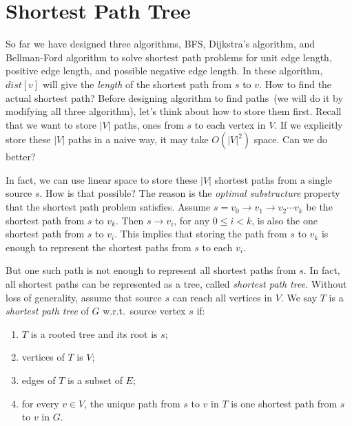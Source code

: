\setcounter{definition}{0} \setcounter{property}{0} \setcounter{claim}{0} \setcounter{fact}{0} \setcounter{corollary}{0} \setcounter{figure}{0}
\section{Shortest Path Tree}

So far we have designed three algorithms, BFS, Dijkstra's algorithm, and Bellman-Ford algorithm
to solve shortest path problems for unit edge length, positive edge length, and possible negative edge length.
In these algorithm, $dist[v]$ will give the \emph{length} of the
shortest path from $s$ to $v$. How to find the actual shortest path?
Before designing algorithm to find paths~(we will do it by modifying all three algorithm),
let's think about how to store them first.
Recall that we want to store $|V|$ paths, ones from $s$ to each vertex in $V$.
If we explicitly store these $|V|$ paths in a naive way, it may take $O(|V|^2)$ space.
Can we do better?

In fact, we can use linear space to store these $|V|$ shortest paths from a single source $s$.
How is that possible? The reason is the \emph{optimal substructure} property that the shortest path problem satisfies.
Assume $s = v_0 \to v_1 \to v_2\cdots v_k$ be the shortest path from $s$ to $v_k$. Then $s \to v_i$, for any $0 \le i < k$,
is also the one shortest path from $s$ to $v_i$. This implies that storing the path from $s$ to $v_k$ is enough to
represent the shortest paths from $s$ to each $v_i$. 

But one such path is not enough to represent all shortest paths from $s$. In fact, all shortest paths
can be represented as a tree, called \emph{shortest path tree}.
Without loss of generality, assume that source $s$ can reach all vertices in $V$.
We say $T$ is a \emph{shortest path tree} of $G$ w.r.t.\ source vertex $s$ if:
\begin{enumerate}
\item $T$ is a rooted tree and its root is $s$;
\item vertices of $T$ is $V$;
\item edges of $T$ is a subset of $E$;
\item for every $v\in V$, the unique path from $s$ to $v$ in $T$ is one shortest path from $s$ to $v$ in $G$.
\end{enumerate}

